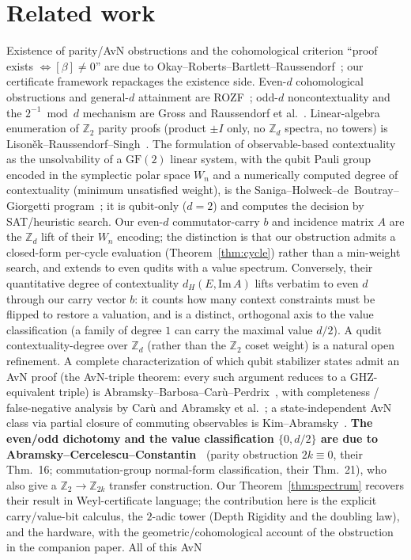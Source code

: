 \documentclass[11pt]{article}
\theoremstyle{remark}
\newcommand{\Z}{\mathbb{Z}}
\begin{document}
\section{Related work}
Existence of parity/AvN obstructions and the cohomological criterion ``proof exists $\iff[\beta]\neq
0$'' are due to Okay--Roberts--Bartlett--Raussendorf~\cite{ORBR}; our certificate framework repackages
the existence side. Even-$d$ cohomological obstructions and general-$d$ attainment are ROZF~\cite{ROZF};
odd-$d$ noncontextuality and the $2^{-1}\bmod d$ mechanism are Gross and Raussendorf et
al.~\cite{Gross,RBDOB}. Linear-algebra enumeration of $\Z_2$ parity proofs (product $\pm I$ only, no $\Z_d$
spectra, no towers) is Lison\v{e}k--Raussendorf--Singh~\cite{LRS}. The formulation of observable-based
contextuality as the unsolvability of a $\mathrm{GF}(2)$ linear system, with the qubit Pauli group
encoded in the symplectic polar space $W_n$ and a numerically computed degree of contextuality
(minimum unsatisfied weight), is the Saniga--Holweck--de~Boutray--Giorgetti
program~\cite{deBoutray,Muller}; it is qubit-only ($d=2$) and computes the decision by SAT/heuristic
search. Our even-$d$ commutator-carry $b$ and incidence matrix $A$ are the $\Z_d$ lift of their $W_n$
encoding; the distinction is that our obstruction admits a closed-form per-cycle evaluation
(Theorem~\ref{thm:cycle}) rather than a min-weight search, and extends to even qudits with a value
spectrum. Conversely, their quantitative degree of contextuality $d_H(E,\mathrm{Im}\,A)$ lifts verbatim
to even $d$ through our carry vector $b$: it counts how many context constraints must be flipped to
restore a valuation, and is a distinct, orthogonal axis to the value classification (a family of
degree $1$ can carry the maximal value $d/2$). A qudit contextuality-degree over $\Z_d$ (rather than
the $\Z_2$ coset weight) is a natural open refinement. A complete characterization of which qubit
stabilizer states admit an AvN proof (the AvN-triple theorem: every such argument reduces to a
GHZ-equivalent triple) is Abramsky--Barbosa--Car\`u--Perdrix~\cite{ABCP}, with completeness /
false-negative analysis by Car\`u and Abramsky et al.~\cite{ABKLM}; a state-independent AvN class via
partial closure of commuting observables is Kim--Abramsky~\cite{KimAbramsky}. \textbf{The even/odd dichotomy and the value classification $\{0,d/2\}$ are due to Abramsky--Cercelescu--Constantin~\cite{ACC24}} (parity obstruction $2k\equiv0$, their Thm.~16; commutation-group normal-form classification, their Thm.~21), who also give a $\Z_2\to\Z_{2k}$ transfer construction. Our Theorem~\ref{thm:spectrum} recovers their result in Weyl-certificate language; the contribution here is the explicit carry/value-bit calculus, the $2$-adic tower (Depth Rigidity and the doubling law), and the hardware, with the geometric/cohomological account of the obstruction in the companion paper. All of this AvN
\end{document}
